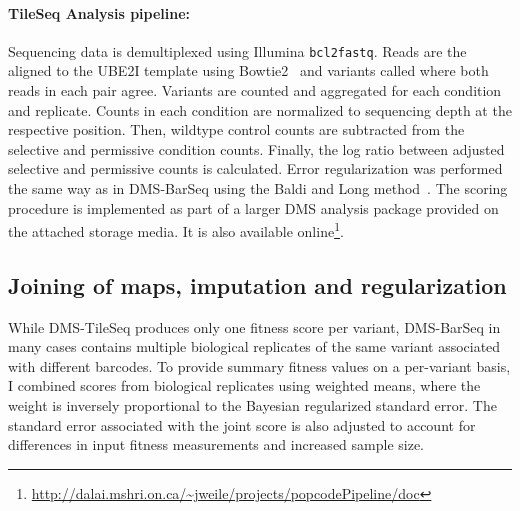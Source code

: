 \paragraph{TileSeq Analysis pipeline:} 
Sequencing data is demultiplexed using Illumina \texttt{bcl2fastq}. Reads are the aligned to the UBE2I template using Bowtie2~\cite{langmead_fast_2012} and variants called where both reads in each pair agree. Variants are counted and aggregated for each condition and replicate.
Counts in each condition are normalized to sequencing depth at the respective position. Then, wildtype control counts are subtracted from the selective and permissive condition counts. Finally, the log ratio between adjusted selective and permissive counts is calculated. Error regularization was performed the same way as in DMS-BarSeq using the Baldi and Long method~\cite{baldi_bayesian_2001}. 
The scoring procedure is implemented as part of a larger DMS analysis package provided on the attached storage media. It is also available online\footnote{\url{http://dalai.mshri.on.ca/~jweile/projects/popcodePipeline/doc}}.

\subsection{Joining of maps, imputation and regularization}

While DMS-TileSeq produces only one fitness score per variant, DMS-BarSeq in many cases contains multiple biological replicates of the same variant associated with different barcodes. To provide summary fitness values on a per-variant basis, I combined scores from biological replicates using weighted means, where the weight is inversely proportional to the Bayesian regularized standard error. The standard error associated with the joint score is also adjusted to account for differences in input fitness measurements and increased sample size.

